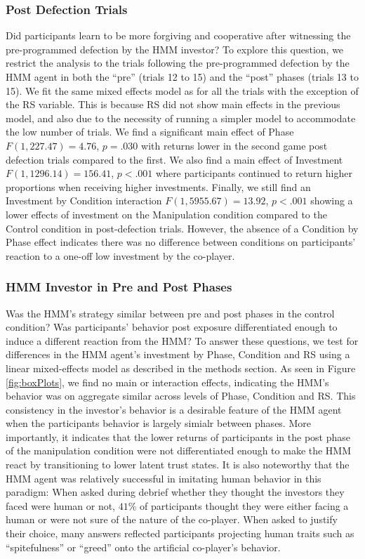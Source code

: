 \documentclass[
]{article}
\begin{document}
\subsubsection{Post Defection Trials}\label{post-defection-trials}

Did participants learn to be more forgiving and cooperative after
witnessing the pre-programmed defection by the HMM investor? To explore
this question, we restrict the analysis to the trials following the
pre-programmed defection by the HMM agent in both the ``pre'' (trials 12
to 15) and the ``post'' phases (trials 13 to 15). We fit the same mixed
effects model as for all the trials with the exception of the RS
variable. This is because RS did not show main effects in the previous
model, and also due to the necessity of running a simpler model to
accommodate the low number of trials. We find a significant main effect
of Phase \(F(1, 227.47) = 4.76\), \(p = .030\)
with returns lower in the second game post defection trials compared to
the first. We also find a main effect of Investment
\(F(1, 1296.14) = 156.41\), \(p < .001\)
where participants continued to return higher proportions when receiving
higher investments. Finally, we still find an Investment by Condition
interaction
\(F(1, 5955.67) = 13.92\), \(p < .001\)
showing a lower effects of investment on the Manipulation condition
compared to the Control condition in post-defection trials. However, the
absence of a Condition by Phase effect indicates there was no difference
between conditions on participants' reaction to a one-off low investment
by the co-player.

\subsubsection{HMM Investor in Pre and Post Phases}\label{hmm-investor-in-pre-and-post-phases}

Was the HMM's strategy similar between pre and post phases in the
control condition? Was participants' behavior post exposure
differentiated enough to induce a different reaction from the HMM? To
answer these questions, we test for differences in the HMM agent's
investment by Phase, Condition and RS using a linear mixed-effects model
as described in the methods section. As seen in Figure
\ref{fig:boxPlots}, we find no main or interaction effects, indicating
the HMM's behavior was on aggregate similar across levels of Phase,
Condition and RS. This consistency in the investor's behavior is a
desirable feature of the HMM agent when the participants behavior is
largely simialr between phases. More importantly, it indicates that the
lower returns of participants in the post phase of the manipulation
condition were not differentiated enough to make the HMM react by
transitioning to lower latent trust states. It is also noteworthy that
the HMM agent was relatively successful in imitating human behavior in
this paradigm: When asked during debrief whether they thought the
investors they faced were human or not, \(41\)\% of participants thought
they were either facing a human or were not sure of the nature of the
co-player. When asked to justify their choice, many answers reflected
participants projecting human traits such as ``spitefulness'' or ``greed''
onto the artificial co-player's behavior.
\end{document}
